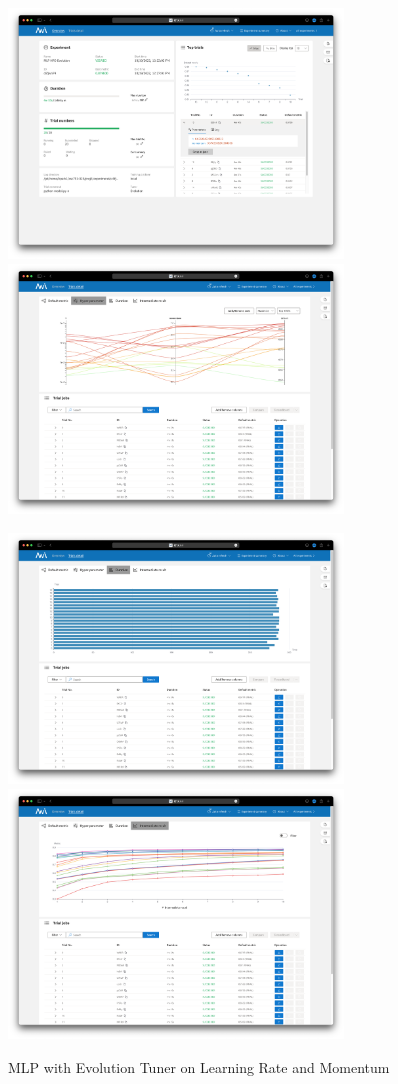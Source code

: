\documentclass{article}
\begin{document}
\begin{figure}
    \centerline{\includegraphics[width=3.5in]{../proj3/figures/mlp_evolution_overview.png}\includegraphics[width=3.5in]{../proj3/figures/mlp_evolution_hyperparameter.png}}
    \centerline{\includegraphics[width=3.5in]{../proj3/figures/mlp_evolution_latency.png}\includegraphics[width=3.5in]{../proj3/figures/mlp_evolution_intermediate.png}}
    \caption{MLP with Evolution Tuner on Learning Rate and Momentum}
    \label{fig:mlp-evolution}
\end{figure}
\end{document}
